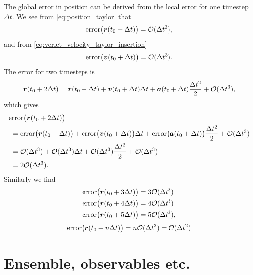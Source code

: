 The global error in position can be derived from the local error for one timestep $\Delta t$. We see from \cref{eq:position_taylor} that
\begin{align*}
    \text{error}\big(\boldsymbol{r}(t_0+\Delta t)\big) = \mathcal{O}(\Delta t^3),
\end{align*}
and from \cref{eq:verlet_velocity_taylor_insertion}
\begin{align*}
    \text{error}\big(\boldsymbol{v}(t_0+\Delta t)\big) = \mathcal{O}(\Delta t^3).
\end{align*}
The error for two timesteps is
\begin{align*}
    \boldsymbol{r}(t_0+2\Delta t) 
    &= \boldsymbol{r}(t_0+\Delta t) + \boldsymbol{v}(t_0+\Delta t)\Delta t + \boldsymbol{a}(t_0+\Delta t)\frac{\Delta t^2}{2} + \mathcal{O}(\Delta t^3), \\
\end{align*}
which gives 
\begin{align*}
    &\text{error}\big(\boldsymbol{r}(t_0+2\Delta t)\big) \\
    &~= \text{error}\big(\boldsymbol{r}(t_0+\Delta t)\big) + \text{error}\big(\boldsymbol{v}(t_0+\Delta t)\big)\Delta t + \text{error}\big(\boldsymbol{a}(t_0+\Delta t)\big)\frac{\Delta t^2}{2} + \mathcal{O}(\Delta t^3)\\
    &~= \mathcal{O}(\Delta t^3) + \mathcal{O}(\Delta t^3)\Delta t + \mathcal{O}(\Delta t^3)\frac{\Delta t^2}{2} + \mathcal{O}(\Delta t^3)\\
    &~= 2\mathcal{O}(\Delta t^3).
\end{align*}
Similarly we find
\begin{align*}
    &\text{error}\big(\boldsymbol{r}(t_0+3\Delta t)\big) = 3\mathcal{O}(\Delta t^3) \\
    &\text{error}\big(\boldsymbol{r}(t_0+4\Delta t)\big) = 4\mathcal{O}(\Delta t^3) \\
    &\text{error}\big(\boldsymbol{r}(t_0+5\Delta t)\big) = 5\mathcal{O}(\Delta t^3),
\end{align*}
\begin{align*}
    \text{error}\big(\boldsymbol{r}(t_0 + n\Delta t)\big) = n\mathcal{O}(\Delta t^3) = \mathcal{O}(\Delta t^2)
\end{align*}


\section{Ensemble, observables etc.}

